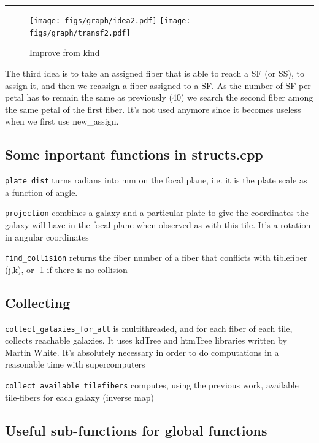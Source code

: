 \documentclass{article}
\begin{document}
\begin{center}\rule{8cm}{0.4pt}\end{center}

\begin{figure}[H]
	\hspace*{5cm}
	\texttt{[image: figs/graph/idea2.pdf]}
	\hspace*{1cm}
	\texttt{[image: figs/graph/transf2.pdf]}\hfill
	\caption{Improve from kind}\label{transf2}
\end{figure}

The third idea is to take an assigned fiber that is able to reach a SF (or SS), to assign it, and then we reassign a fiber assigned to a SF. As the number of SF per petal has to remain the same as previously (40) we search the second fiber among the same petal of the first fiber. It's not used anymore since it becomes useless when we first use new\_assign.


\subsection{Some inportant functions in structs.cpp}
{\tt plate\_dist} turns radians into mm on the focal plane, i.e. it is the plate scale as a function of angle.

{\tt projection} combines a galaxy and a particular plate to give the coordinates the galaxy will have in the focal plane when observed as with this tile. It's a rotation in angular coordinates

{\tt find\_collision} returns the fiber number of a fiber that conflicts with tiblefiber (j,k), or -1 if there is no collision 

\subsection{Collecting}
{\tt collect\_galaxies\_for\_all} is multithreaded, and for each fiber of each tile, collects reachable galaxies. It uses kdTree and htmTree libraries written by Martin White. It's absolutely necessary in order to do computations in a reasonable time with supercomputers

{\tt collect\_available\_tilefibers} computes, using the previous work, available tile-fibers for each galaxy (inverse map)

\subsection{Useful sub-functions for global functions}
\end{document}
